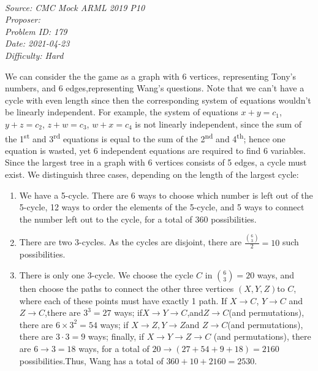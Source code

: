 
\SSbreak\\
\emph{Source: CMC Mock ARML 2019 P10}\\
\emph{Proposer: \Pnjoy}\\
\emph{Problem ID: 179}\\
\emph{Date: 2021-04-23}\\
\emph{Difficulty: Hard}\\
\SSbreak

\bigskip

\begin{solution}\hfil\medskip

    We can consider the the game as a graph with 6 vertices, representing Tony’s numbers, and 6 edges,representing Wang’s questions.  Note that we can’t have a cycle with even length since then the corresponding system of equations wouldn’t be linearly independent.  For example, the system of equations $x+y=c_1$, $y+z=c_2$, $z+w=c_3$, $w+x=c_4$ is not linearly independent, since the sum of the 1\textsuperscript{st} and 3\textsuperscript{rd} equations is equal to the sum of the 2\textsuperscript{nd} and 4\textsuperscript{th}; hence one equation is wasted, yet 6 independent equations are required to find 6 variables. Since the largest tree in a graph with 6 vertices consists of 5 edges, a cycle must exist.  We distinguish three cases, depending on the length of the largest cycle:
    \begin{enumerate}
    \item We have a 5-cycle.  There are 6 ways to choose which number is left out of the 5-cycle, 12 ways to order the elements of the 5-cycle, and 5 ways to connect the number left out to the cycle, for a total of 360 possibilities.
    \item There are two 3-cycles.  As the cycles are disjoint, there are \(\frac{\binom{6}{3}}{2}= 10\) such possibilities.
    \item There is only one 3-cycle.  We choose the cycle $C$ in \(\binom{6}{3}= 20\) ways, and then choose the paths to connect the other three vertices $(X, Y, Z)$to $C$, where each of these points must have exactly 1 path.  If $X \rightarrow C$, $Y \rightarrow C$ and $Z \rightarrow C$,there are $3^3= 27$ ways; if$X \rightarrow Y \rightarrow C$,and$Z \rightarrow C$(and permutations), there are $6 \times 3^2= 54$ ways; if $X \rightarrow Z, Y \rightarrow Z$and \(Z\rightarrow C\)(and permutations), there are \(3\cdot3 = 9\) ways; finally, if \(X\rightarrow Y\rightarrow Z\rightarrow C\) (and permutations), there are \(6\rightarrow3 = 18\) ways, for a total of \(20\rightarrow(27 + 54 + 9 + 18) = 2160\) possibilities.Thus, Wang has a total of \(360 + 10 + 2160 = \boxed{2530}.\)
    \end{enumerate}

\end{solution}\bigskip
